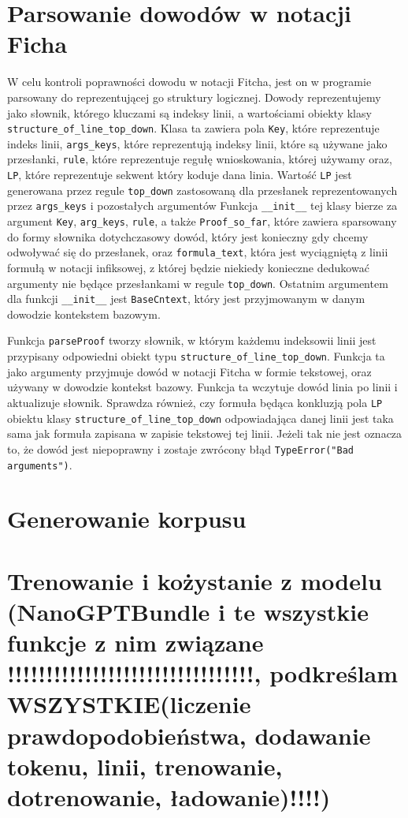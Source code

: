 \documentclass{article}
\begin{document}
\section{Parsowanie dowodów w notacji Ficha}
W celu kontroli poprawności dowodu w notacji Fitcha, jest on w programie parsowany do reprezentującej go struktury logicznej. Dowody reprezentujemy jako słownik, którego kluczami są indeksy linii, a wartościami 
obiekty klasy \texttt{structure\_of\_line\_top\_down}.%
 Klasa ta zawiera pola \texttt{Key}, które reprezentuje indeks linii, \texttt{args\_keys}, które reprezentują indeksy linii, które są używane jako przesłanki, 
\texttt{rule}, które reprezentuje regułę wnioskowania, której używamy oraz, \texttt{LP}, które reprezentuje sekwent który koduje dana linia. Wartość \texttt{LP} jest generowana przez regule \texttt{top\_down} 
zastosowaną dla przesłanek reprezentowanych przez \texttt{args\_keys} i pozostałych argumentów 
Funkcja \texttt{\_\_init\_\_} tej klasy bierze za argument \texttt{Key}, \texttt{arg\_keys}, \texttt{rule}, a także \texttt{Proof\_so\_far}, które zawiera sparsowany do formy słownika dotychczasowy dowód, który 
jest konieczny gdy chcemy odwoływać się do przesłanek, oraz \texttt{formula\_text}, która jest wyciągniętą z linii formułą w notacji infiksowej, z której będzie niekiedy konieczne dedukować argumenty nie będące 
przesłankami w regule \texttt{top\_down}. Ostatnim argumentem dla funkcji \texttt{\_\_init\_\_} jest \texttt{BaseCntext}, który jest przyjmowanym w danym dowodzie kontekstem bazowym.

Funkcja \texttt{parseProof} tworzy słownik, w którym każdemu indeksowii linii jest przypisany odpowiedni obiekt typu \texttt{structure\_of\_line\_top\_down}. Funkcja ta jako argumenty przyjmuje dowód w notacji Fitcha w formie tekstowej, oraz używany w dowodzie kontekst bazowy. Funkcja ta wczytuje dowód linia po linii i aktualizuje słownik. Sprawdza również, czy formuła będąca konkluzją pola \texttt{LP}
obiektu klasy \texttt{structure\_of\_line\_top\_down} odpowiadająca danej linii jest taka sama jak formuła zapisana w zapisie tekstowej tej linii. Jeżeli tak nie jest oznacza to, że dowód jest niepoprawny
i zostaje zwrócony błąd \texttt{TypeError("Bad arguments")}.


\section{Generowanie korpusu}

\section{Trenowanie i kożystanie z modelu (NanoGPTBundle i te wszystkie funkcje z nim związane !!!!!!!!!!!!!!!!!!!!!!!!!!!!!!!!, podkreślam WSZYSTKIE(liczenie prawdopodobieństwa, dodawanie tokenu, linii, trenowanie, dotrenowanie, ładowanie)!!!!)}
\end{document}
